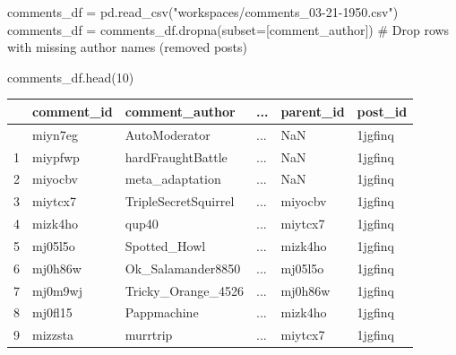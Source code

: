 \documentclass[
  12pt,
  letterpaper,
  DIV=11,
  numbers=noendperiod]{scrartcl}
\newenvironment{Shaded}{\begin{snugshade}}{\end{snugshade}}
\newcommand{\CommentTok}[1]{\textcolor[rgb]{0.37,0.37,0.37}{#1}}
\newcommand{\DecValTok}[1]{\textcolor[rgb]{0.68,0.00,0.00}{#1}}
\newcommand{\NormalTok}[1]{\textcolor[rgb]{0.00,0.23,0.31}{#1}}
\newcommand{\OperatorTok}[1]{\textcolor[rgb]{0.37,0.37,0.37}{#1}}
\newcommand{\StringTok}[1]{\textcolor[rgb]{0.13,0.47,0.30}{#1}}
\begin{document}
\begin{Shaded}
\begin{Highlighting}[]
\NormalTok{comments\_df }\OperatorTok{=}\NormalTok{ pd.read\_csv(}\StringTok{"workspaces/comments\_03{-}21{-}1950.csv"}\NormalTok{)}
\NormalTok{comments\_df }\OperatorTok{=}\NormalTok{ comments\_df.dropna(subset}\OperatorTok{=}\NormalTok{[}\StringTok{\textquotesingle{}comment\_author\textquotesingle{}}\NormalTok{])  }\CommentTok{\# Drop rows with missing author names (removed posts)}

\NormalTok{comments\_df.head(}\DecValTok{10}\NormalTok{)}
\end{Highlighting}
\end{Shaded}

\begin{longtable}[]{@{}llllll@{}}
\toprule\noalign{}
& comment\_id & comment\_author & ... & parent\_id & post\_id \\
\midrule\noalign{}
\endhead
\bottomrule\noalign{}
\endlastfoot
0 & miyn7eg & AutoModerator & ... & NaN & 1jgfinq \\
1 & miypfwp & hardFraughtBattle & ... & NaN & 1jgfinq \\
2 & miyocbv & meta\_adaptation & ... & NaN & 1jgfinq \\
3 & miytcx7 & TripleSecretSquirrel & ... & miyocbv & 1jgfinq \\
4 & mizk4ho & qup40 & ... & miytcx7 & 1jgfinq \\
5 & mj05l5o & Spotted\_Howl & ... & mizk4ho & 1jgfinq \\
6 & mj0h86w & Ok\_Salamander8850 & ... & mj05l5o & 1jgfinq \\
7 & mj0m9wj & Tricky\_Orange\_4526 & ... & mj0h86w & 1jgfinq \\
8 & mj0fl15 & Pappmachine & ... & mizk4ho & 1jgfinq \\
9 & mizzsta & murrtrip & ... & miytcx7 & 1jgfinq \\
\end{longtable}
\end{document}

